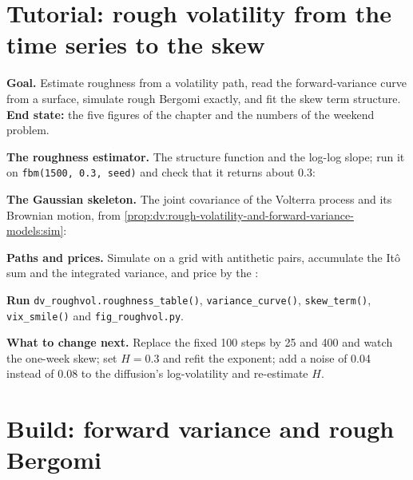 \section{Tutorial: rough volatility from the time series to the skew}\label{tut:dv:rough-volatility-and-forward-variance-models:tut}

\begin{tutorial}
\textbf{Goal.} Estimate roughness from a volatility path, read the forward-variance curve from a surface,
simulate rough Bergomi exactly, and fit the skew term structure. \textbf{End state:} the five figures of the
chapter and the numbers of the weekend problem.
\begin{tutsteps}
\item \textbf{The roughness estimator.} The structure function and the log-log slope; run it on
\texttt{fbm(1500, 0.3, seed)} and check that it returns about 0.3:
\label{lst:dv:rough-volatility-and-forward-variance-models:rough}
\item \textbf{The Gaussian skeleton.} The joint covariance of the Volterra process and its Brownian motion,
from \cref{prop:dv:rough-volatility-and-forward-variance-models:sim}:
\label{lst:dv:rough-volatility-and-forward-variance-models:cov}
\item \textbf{Paths and prices.} Simulate on a grid with antithetic pairs, accumulate the Itô sum and the
integrated variance, and price by the :
\label{lst:dv:rough-volatility-and-forward-variance-models:rbergomi}
\item \textbf{Run} \texttt{dv\_roughvol.roughness\_table()}, \texttt{variance\_curve()}, \texttt{skew\_term()},
\texttt{vix\_smile()} and \texttt{fig\_roughvol.py}.
\end{tutsteps}
\textbf{What to change next.} Replace the fixed 100 steps by 25 and 400 and watch the one-week skew; set $H=0.3$ and
refit the exponent; add a noise of 0.04 instead of 0.08 to the diffusion's log-volatility and re-estimate $H$.
\end{tutorial}

\section{Build: forward variance and rough Bergomi}\label{bld:dv:rough-volatility-and-forward-variance-models:fwdvar}

